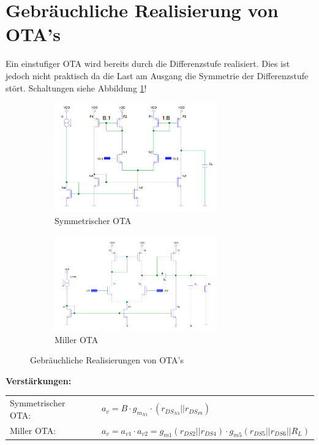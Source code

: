 \section{Gebräuchliche Realisierung von OTA's}
Ein einstufiger OTA wird bereits durch die Differenzstufe realisiert. Dies ist jedoch nicht praktisch da die Last am
Ausgang die Symmetrie der Differenzstufe stört.
Schaltungen siehe Abbildung \ref{fig:otas}!
\begin{figure}[htp]
\begin{center}
	\begin{subfigure}[b]{8cm}
		\centering
		\includegraphics[width=7cm]{images/SymetrischerOTA.png}
		\caption{Symmetrischer OTA}
	\end{subfigure}
	\begin{subfigure}[b]{8cm}
		\centering
		\includegraphics[width=7cm]{images/millerOTA.png}
		\caption{Miller OTA}
	\end{subfigure}
	\caption{Gebräuchliche Realisierungen von OTA's}
	\label{fig:otas}
\end{center}
\end{figure}

\textbf{Verstärkungen:} \\
\begin{tabular}{lll}
	Symmetrischer OTA:	& & $a_v = B \cdot g_{m_{N1}} \cdot (r_{DS_{N3}} || r_{DS_{P3}})$ \\
	Miller OTA:			& & $a_v = a_{v1} \cdot a_{v2} = g_{m1}(r_{DS2} || r_{DS4}) \cdot g_{m5}(r_{DS5} || r_{DS6} || R_L)$
\end{tabular}

